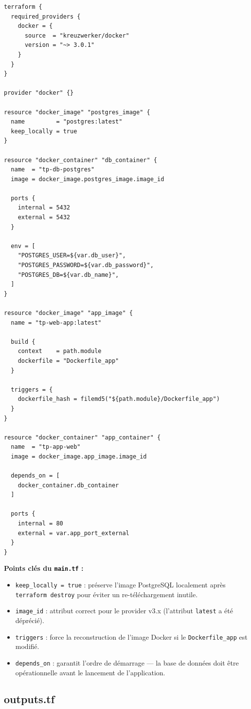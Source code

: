 \documentclass[12pt,a4paper]{report}
\begin{document}
\begin{lstlisting}[style=terraform, caption={main.tf --- Configuration principale Terraform}]
terraform {
  required_providers {
    docker = {
      source  = "kreuzwerker/docker"
      version = "~> 3.0.1"
    }
  }
}

provider "docker" {}

resource "docker_image" "postgres_image" {
  name         = "postgres:latest"
  keep_locally = true
}

resource "docker_container" "db_container" {
  name  = "tp-db-postgres"
  image = docker_image.postgres_image.image_id

  ports {
    internal = 5432
    external = 5432
  }

  env = [
    "POSTGRES_USER=${var.db_user}",
    "POSTGRES_PASSWORD=${var.db_password}",
    "POSTGRES_DB=${var.db_name}",
  ]
}

resource "docker_image" "app_image" {
  name = "tp-web-app:latest"

  build {
    context    = path.module
    dockerfile = "Dockerfile_app"
  }

  triggers = {
    dockerfile_hash = filemd5("${path.module}/Dockerfile_app")
  }
}

resource "docker_container" "app_container" {
  name  = "tp-app-web"
  image = docker_image.app_image.image_id

  depends_on = [
    docker_container.db_container
  ]

  ports {
    internal = 80
    external = var.app_port_external
  }
}
\end{lstlisting}

\textbf{Points clés du \texttt{main.tf} :}
\begin{itemize}
  \item \texttt{keep\_locally = true} : préserve l'image PostgreSQL localement après \texttt{terraform destroy} pour éviter un re-téléchargement inutile.
  \item \texttt{image\_id} : attribut correct pour le provider v3.x (l'attribut \texttt{latest} a été déprécié).
  \item \texttt{triggers} : force la reconstruction de l'image Docker si le \texttt{Dockerfile\_app} est modifié.
  \item \texttt{depends\_on} : garantit l'ordre de démarrage --- la base de données doit être opérationnelle avant le lancement de l'application.
\end{itemize}

\subsection{outputs.tf}
\end{document}
